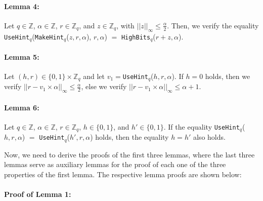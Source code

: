 \documentclass[runningheads]{llncs}
\numberwithin{equation}{section}
\begin{document}
    \paragraph{\textbf{Lemma 4:}} Let $q \in \mathbb{Z}$, $\alpha \in \mathbb{Z}$, $r \in {\mathbb{Z}}_{q}$, and $z \in {\mathbb{Z}}_{q}$, with ${||z||}_{\infty} \leq \frac{\alpha}{2}$. Then, we verify the equality \texttt{UseHint}${}_{q}$(\texttt{MakeHint}${}_{q}$($z, r, \alpha$), $r, \alpha$) $=$ \texttt{HighBits}${}_{q}$($r + z, \alpha$).

    \paragraph{\textbf{Lemma 5:}} Let $(h,r) \in \{ 0, 1 \} \times {\mathbb{Z}}_{q}$ and let ${v}_{1} = $\texttt{UseHint}${}_{q}$($h, r, \alpha$). If $h = 0$ holds, then we verify ${|| r - {v}_{1} \times \alpha ||}_{\infty} \leq \frac{\alpha}{2}$, else we verify ${|| r - {v}_{1} \times \alpha ||}_{\infty} \leq \alpha + 1$.

    \paragraph{\textbf{Lemma 6:}} Let $q \in \mathbb{Z}$, $\alpha \in \mathbb{Z}$, $r \in {\mathbb{Z}}_{q}$, $h \in \{ 0, 1 \}$, and $h' \in \{ 0, 1 \}$. If the equality \texttt{UseHint}${}_{q}$($h, r, \alpha$) $=$ \texttt{UseHint}${}_{q}$($h', r, \alpha$) holds, then the equality $h = h'$ also holds.

    \vspace{2.5ex}
    
    \noindent Now, we need to derive the proofs of the first three lemmas, where the last three lemmas serve as auxiliary lemmas for the proof of each one of the three properties of the first lemma. The respective lemma proofs are shown below:

    \paragraph{\textbf{Proof of Lemma 1:}}\mbox{\\}
    
\end{document}
